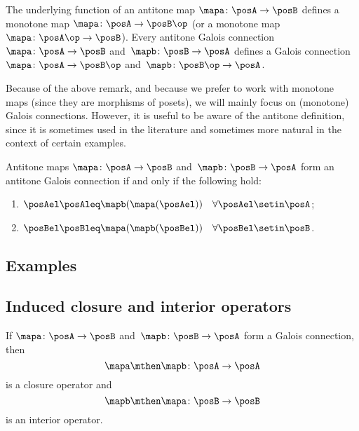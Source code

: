 \begin{remark}\label{rem:not-focusing-on-antitone-Galois-connections}
    The underlying function of an antitone map $\mapa\colon \posA\to \posB$ defines a monotone map $\mapa\colon \posA\to \posB\op$ (or a monotone map $\mapa \colon \posA \op \to \posB$).
    Every antitone Galois connection $\mapa \colon \posA \to \posB$ and~$\mapb \colon \posB \to \posA$ defines a Galois connection $\mapa \colon \posA \to \posB\op$ and~$\mapb \colon \posB\op \to \posA$.
\end{remark}

Because of the above remark, and because we prefer to work with monotone maps (since they are morphisms of posets), we will mainly focus on (monotone) Galois connections.
However, it is useful to be aware of the antitone definition, since it is sometimes used in the literature and sometimes more natural in the context of certain examples.

\begin{lemma}\label{lem:alternative-def-antitone-Galois-connection}
    Antitone maps $\mapa\colon \posA\to \posB$ and~$\mapb\colon \posB\to \posA$ form an antitone Galois connection if and only if the following hold:
    \begin{enumerate}
        \item $\posAel\posAleq \mapb(\mapa(\posAel)) \quad \forall \posAel\setin \posA$;
        \item $\posBel\posBleq \mapa(\mapb(\posBel)) \quad \forall \posBel\setin \posB$.
    \end{enumerate}
\end{lemma}

\subsection{Examples}


\subsection{Induced closure and interior operators}

\begin{lemma}\label{lem:closure-interior-operators-from-Galois-connection}
    If $\mapa \colon \posA \to \posB$ and~$\mapb \colon \posB \to \posA$ form a Galois connection, then
    \begin{equation}\label{eq:closure-from-Galois}
        \mapa \mthen \mapb \colon \posA \to \posA
    \end{equation}
    is a closure operator and
    \begin{equation}\label{eq:interior-from-Galois}
        \mapb \mthen \mapa \colon \posB \to \posB
    \end{equation}
    is an interior operator.
\end{lemma}

